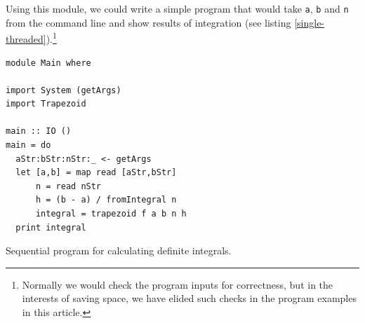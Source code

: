 \documentclass{tmr}
\begin{document}
Using this module, we could write a simple program that would take
\verb|a|, \verb|b| and \verb|n| from the command line and show results
of integration (see listing \ref{single-threaded}).\footnote{Normally we would check the program inputs for correctness, but in
the interests of saving space, we have elided such checks in the program examples in this article.}

\begin{listing}
\begin{Verbatim}
module Main where

import System (getArgs)
import Trapezoid

main :: IO ()
main = do
  aStr:bStr:nStr:_ <- getArgs
  let [a,b] = map read [aStr,bStr]
      n = read nStr
      h = (b - a) / fromIntegral n
      integral = trapezoid f a b n h
  print integral 
\end{Verbatim}
\caption{Sequential program for calculating definite integrals. \label{single-threaded}}
\end{listing}


%


\end{document}
